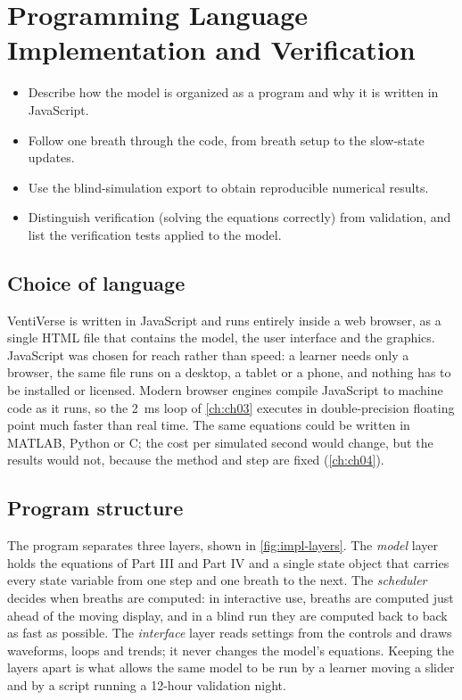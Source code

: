 \chapter{Programming Language Implementation and Verification}
\label{ch:ch05}

\begin{objectives}
\begin{itemize}[leftmargin=*]
  \item Describe how the model is organized as a program and why it is written in JavaScript.
  \item Follow one breath through the code, from breath setup to the slow-state updates.
  \item Use the blind-simulation export to obtain reproducible numerical results.
  \item Distinguish verification (solving the equations correctly) from validation, and list the verification tests applied to the model.
\end{itemize}
\end{objectives}

\section{Choice of language}
\label{sec:impl-language}
VentiVerse is written in JavaScript and runs entirely inside a web browser, as a single HTML file that contains the model, the user interface and the graphics. JavaScript was chosen for reach rather than speed: a learner needs only a browser, the same file runs on a desktop, a tablet or a phone, and nothing has to be installed or licensed. Modern browser engines compile JavaScript to machine code as it runs, so the \SI{2}{\milli\second} loop of \cref{ch:ch03} executes in double-precision floating point much faster than real time. The same equations could be written in MATLAB, Python or C; the cost per simulated second would change, but the results would not, because the method and step are fixed (\cref{ch:ch04}).

\section{Program structure}
\label{sec:impl-structure}
The program separates three layers, shown in \cref{fig:impl-layers}. The \emph{model} layer holds the equations of Part III and Part IV and a single state object that carries every state variable from one step and one breath to the next. The \emph{scheduler} decides when breaths are computed: in interactive use, breaths are computed just ahead of the moving display, and in a blind run they are computed back to back as fast as possible. The \emph{interface} layer reads settings from the controls and draws waveforms, loops and trends; it never changes the model's equations. Keeping the layers apart is what allows the same model to be run by a learner moving a slider and by a script running a 12-hour validation night.

